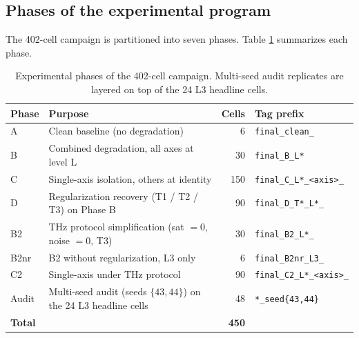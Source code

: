 \subsection{Phases of the experimental program}

The 402-cell campaign is partitioned into seven phases. Table
\ref{tab:phase_overview} summarizes each phase.

\begin{table}[htbp]
\centering
\caption{Experimental phases of the 402-cell campaign. Multi-seed audit replicates are layered on top of the 24 L3 headline cells.}
\label{tab:phase_overview}
\setlength{\tabcolsep}{4pt}
\renewcommand{\arraystretch}{1.1}
\begin{tabular}{llrl}
\toprule
Phase & Purpose & Cells & Tag prefix \\
\midrule
A      & Clean baseline (no degradation)                    & 6   & \texttt{final\_clean\_} \\
B      & Combined degradation, all axes at level L         & 30  & \texttt{final\_B\_L*} \\
C      & Single-axis isolation, others at identity         & 150 & \texttt{final\_C\_L*\_<axis>\_} \\
D      & Regularization recovery (T1 / T2 / T3) on Phase B & 90  & \texttt{final\_D\_T*\_L*\_} \\
B2     & THz protocol simplification (sat $=0$, noise $=0$, T3) & 30 & \texttt{final\_B2\_L*\_} \\
B2nr   & B2 without regularization, L3 only                & 6   & \texttt{final\_B2nr\_L3\_} \\
C2     & Single-axis under THz protocol                    & 90  & \texttt{final\_C2\_L*\_<axis>\_} \\
\midrule
Audit  & Multi-seed audit (seeds $\{43, 44\}$) on the 24 L3 headline cells & 48 & \texttt{*\_seed\{43,44\}} \\
\midrule
\textbf{Total} & & \textbf{450} & \\
\bottomrule
\end{tabular}
\end{table}
